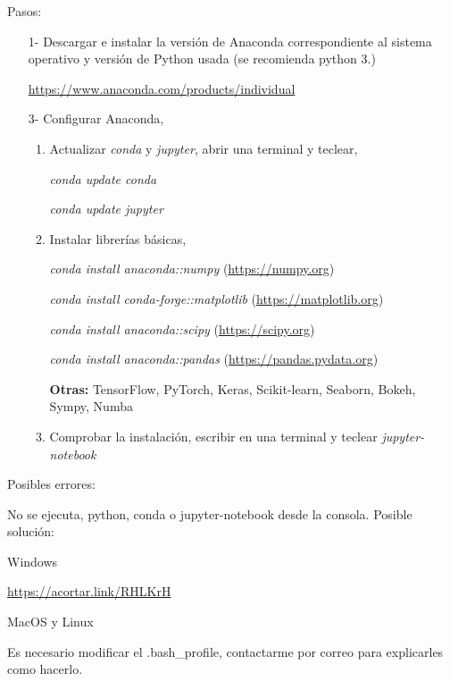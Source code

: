 \documentclass[12pt]{amsart} %
\begin{document}
Pasos:
\begin{itemize}
	\item[1-] Descargar e instalar la versión de Anaconda correspondiente al sistema o\-perativo y versión de Python usada (se recomienda python 3.)
	 
	\url{https://www.anaconda.com/products/individual}
	
	\item[3-] Configurar Anaconda,
	
	\begin{enumerate}
		\item Actualizar \textit{conda} y \textit{jupyter}, abrir una terminal y teclear,
			\vspace{8pt}
	
			\emph{conda update conda}
	
			\emph{conda update jupyter}
		\item Instalar librerías básicas,
			\vspace{8pt}
	
			\emph{conda install anaconda::numpy} (\url{https://numpy.org})
	
			\emph{conda install conda-forge::matplotlib} (\url{https://matplotlib.org})
	
			\emph{conda install anaconda::scipy} (\url{https://scipy.org})
	
		\emph{conda install anaconda::pandas} (\url{https://pandas.pydata.org})
	
	\vspace{8pt}
	
	\textbf{Otras:} TensorFlow, PyTorch, Keras, Scikit-learn, Seaborn, Bokeh, Sympy, Numba
	\item Comprobar la instalación, escribir en una terminal y teclear
	\vspace{8pt}
	\emph{jupyter-notebook}
		\end{enumerate}
\end{itemize}

Posibles errores:
\vspace{8pt}

No se ejecuta, python, conda o jupyter-notebook desde la consola. Posible solución:

\vspace{8pt}
Windows

\url{https://acortar.link/RHLKrH}

\vspace{8pt}
MacOS y Linux

Es necesario modificar el .bash\_profile, contactarme por correo para explicarles como hacerlo. 
\end{document}

